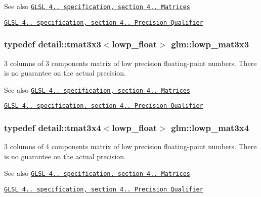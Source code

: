\begin{DoxySeeAlso}{See also}
\href{http://www.opengl.org/registry/doc/GLSLangSpec.4.20.8.pdf}{\tt G\+L\+S\+L 4.. specification, section 4.. Matrices} 

\href{http://www.opengl.org/registry/doc/GLSLangSpec.4.20.8.pdf}{\tt G\+L\+S\+L 4.. specification, section 4.. Precision Qualifier} 
\end{DoxySeeAlso}
\hypertarget{group__core__precision_gaf4dbe8a227cee5c02b5ab3faa0d948f5}{}
\subsubsection[{lowp\+\_\+mat3x3}]{\setlength{\rightskip}{0pt plus 5cm}typedef detail\+::tmat3x3$<$lowp\+\_\+float$>$ {\bf glm\+::lowp\+\_\+mat3x3}}\label{group__core__precision_gaf4dbe8a227cee5c02b5ab3faa0d948f5}
3 columns of 3 components matrix of low precision floating-\/point numbers. There is no guarantee on the actual precision.

\begin{DoxySeeAlso}{See also}
\href{http://www.opengl.org/registry/doc/GLSLangSpec.4.20.8.pdf}{\tt G\+L\+S\+L 4.. specification, section 4.. Matrices} 

\href{http://www.opengl.org/registry/doc/GLSLangSpec.4.20.8.pdf}{\tt G\+L\+S\+L 4.. specification, section 4.. Precision Qualifier} 
\end{DoxySeeAlso}
\hypertarget{group__core__precision_ga1b202ac2d7cea4f30ad802471f6081ac}{}
\subsubsection[{lowp\+\_\+mat3x4}]{\setlength{\rightskip}{0pt plus 5cm}typedef detail\+::tmat3x4$<$lowp\+\_\+float$>$ {\bf glm\+::lowp\+\_\+mat3x4}}\label{group__core__precision_ga1b202ac2d7cea4f30ad802471f6081ac}
3 columns of 4 components matrix of low precision floating-\/point numbers. There is no guarantee on the actual precision.

\begin{DoxySeeAlso}{See also}
\href{http://www.opengl.org/registry/doc/GLSLangSpec.4.20.8.pdf}{\tt G\+L\+S\+L 4.. specification, section 4.. Matrices} 

\href{http://www.opengl.org/registry/doc/GLSLangSpec.4.20.8.pdf}{\tt G\+L\+S\+L 4.. specification, section 4.. Precision Qualifier} 
\end{DoxySeeAlso}
\hypertarget{group__core__precision_ga39e75439a03361f4407feab2e2eb5f93}{}
